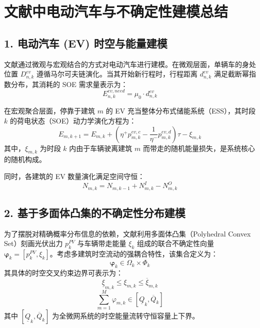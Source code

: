 \documentclass[11pt]{ctexart}
\begin{document}
\section*{文献中电动汽车与不确定性建模总结}

\subsection{1. 电动汽车 (EV) 时空与能量建模}
文献通过微观与宏观结合的方式对电动汽车进行建模。在微观层面，单辆车的身处位置 $D_{n,k}^{ev}$ 遵循马尔可夫链演化。当其开始新行程时，行程距离 $d_{n,k}^{ev}$ 满足截断幂指数分布，其消耗的 SOE 需求量表示为：
\begin{equation}
E_{n,k}^{ev,need} = \mu_{0} \cdot d_{n,k}^{ev}
\end{equation}

在宏观聚合层面，停靠于建筑 $m$ 的 EV 充当整体分布式储能系统（ESS），其时段 $k$ 的荷电状态（SOE）动力学演化方程为：
\begin{equation}
E_{m,k+1} = E_{m,k} + \left( \eta^+ p_{m,k}^{ev,c} - \frac{1}{\eta^-} p_{m,k}^{ev,d} \right) \tau - \xi_{m,k}
\end{equation}
其中，$\xi_{m,k}$ 为时段 $k$ 内由于车辆驶离建筑 $m$ 而带走的随机能量损失，是系统核心的随机构成。

同时，各建筑的 EV 数量演化满足空间守恒：
\begin{equation}
N_{m,k} = N_{m,k-1} + N_{m,k}^{I} - N_{m,k}^{O}
\end{equation}

\subsection{2. 基于多面体凸集的不确定性分布建模}
为了摆脱对精确概率分布信息的依赖，文献利用多面体凸集（Polyhedral Convex Set）刻画光伏出力 $p_{k}^{PV}$ 与车辆带走能量 $\xi_{k}$ 组成的联合不确定性向量 $\bm{\varphi}_{k} = [p_{k}^{PV}, \xi_{k}]$。考虑多建筑时空流动的强耦合特性，该集合定义为：
\begin{equation}
\bm{\varphi}_{k} \in \Omega_k \times \Phi_k
\end{equation}
其具体的时空交叉约束边界可表示为：
\begin{equation}
\underline{\xi}_{m,k} \le \xi_{m,k} \le \overline{\xi}_{m,k}
\end{equation}
\begin{equation}
\sum_{m=1}^{M} \varphi_{m,k} \in [\underline{Q}_k, \overline{Q}_k]
\end{equation}
其中 $[\underline{Q}_k, \overline{Q}_k]$ 为全微网系统的时空能量流转守恒容量上下界。
\end{document}

